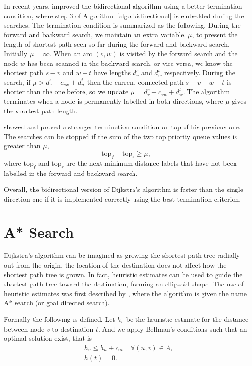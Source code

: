 In recent years,
\citet{Goldberg05} improved the bidirectional algorithm using a better termination condition,
where step 3 of Algorithm~\ref{algo:bidirectional} is embedded during the searches.
The termination condition is summarized as the following.
During the forward and backward search,
we maintain an extra variable, $\mu$, to present the length of shortest path seen so far during the forward and backward search.
Initially $\mu = \infty$.
When an arc $(v,w)$ is visited by the forward search and the node $w$ has been scanned in the backward search, or vice versa,
we know the shortest path $s-v$ and $w-t$ have lengths $d_v^s$ and $d_w^t$ respectively.
During the search, if $\mu > d_v^s + c_{vw} + d_w^t$ then the current connected path $s-v-w-t$ is shorter than the one before, 
so we update $\mu = d_v^s + c_{vw} + d_w^t$.
The algorithm terminates when a node is permanently labelled in both directions,
where $\mu$ gives the shortest path length.

\citet{GoldbergEPP} showed and proved a stronger termination condition on top of his previous one.
The searches can be stopped if the sum of the two top priority queue values is greater than $\mu$,
\[
    \text{top}_f + \text{top}_r \geq \mu,
\]
where $\text{top}_f$ and $\text{top}_r$ are the next minimum distance labels that have not been labelled in the forward and backward search.

Overall, the bidirectional version of Dijkstra's algorithm is faster than the single direction one if it is implemented correctly using the best termination criterion.

\section{A* Search}\label{section:A*}
Dijkstra's algorithm can be imagined as growing the shortest path tree radially out from the origin,
the location of the destination does not affect how the shortest path tree is grown.
In fact, heuristic estimates can be used to guide the shortest path tree toward the destination,
forming an ellipsoid shape.
The use of heuristic estimates was first described by \citet{Astar},
where the algorithm is given the name A* search (or goal directed search).


Formally the following is defined.
Let $h_v$ be the heuristic estimate for the distance between node $v$ to destination $t$.
And we apply Bellman's conditions such that an optimal solution exist, that is 
\begin{align}
    &h_v \leq h_u + c_{uv} \quad \forall(u,v) \in A, \\
    &h(t) = 0.
\end{align}

